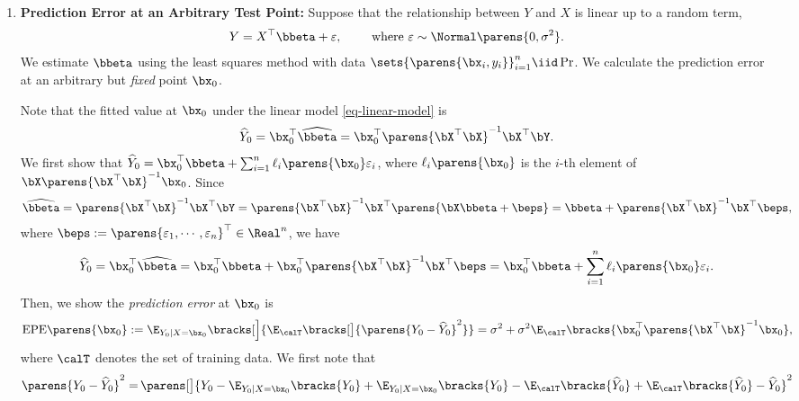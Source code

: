 \documentclass[12pt]{article}
\begin{document}
\begin{enumerate}[label=\textbf{\arabic*.}]
	\item \textbf{Prediction Error at an Arbitrary Test Point:} Suppose that the relationship between $Y$ and $X$ is linear up to a random term, 
	\begin{align}\label{eq-linear-model}
		Y = X^\top \bbeta + \varepsilon, \qquad \text{ where } \varepsilon \sim \Normal \parens{0, \sigma^2}. 
	\end{align}
	We estimate $\bbeta$ using the least squares method with data $\sets{\parens{\bx_i, y_i}}_{i=1}^n \iid \Pr$. We calculate the prediction error at an arbitrary but \emph{fixed} point $\bx_0$. 
	
	Note that the fitted value at $\bx_0$ under the linear model \eqref{eq-linear-model} is 
	\begin{align*}
		\widehat{Y}_0 = \bx_0^\top \widehat{\bbeta} = \bx_0^\top \parens{\bX^\top \bX}^{-1} \bX^\top \bY. 
	\end{align*}
	We first show that $\widehat{Y}_0 = \bx_0^\top \bbeta + \sum_{i=1}^n \ell_i \parens{\bx_0} \varepsilon_i$, where $\ell_i \parens{\bx_0}$ is the $i$-th element of $\bX \parens{\bX^\top \bX}^{-1} \bx_0$. Since 
	\begin{align*}
		\widehat{\bbeta} = \parens{\bX^\top \bX}^{-1} \bX^\top \bY = \parens{\bX^\top \bX}^{-1} \bX^\top \parens{\bX \bbeta + \beps} = \bbeta + \parens{\bX^\top \bX}^{-1} \bX^\top \beps, 
	\end{align*}
	where $\beps := \parens{\varepsilon_1, \cdots, \varepsilon_n}^\top \in \Real^n$, we have 
	\begin{align*}
		\widehat{Y}_0 = \bx_0^\top \widehat{\bbeta} = \bx_0^\top \bbeta + \bx_0^\top \parens{\bX^\top \bX}^{-1} \bX^\top \beps = \bx_0^\top \bbeta + \sum_{i=1}^n \ell_i \parens{\bx_0} \varepsilon_i. 
	\end{align*}
	Then, we show the \emph{prediction error} at $\bx_0$ is 
	\begin{align*}
		\mathrm{EPE} \parens{\bx_0} := \E_{Y_0 \mid X = \bx_0} \bracks[\Big]{\E_{\calT} \bracks[\big]{ \parens{Y_0 - \widehat{Y}_0}^2 }} = \sigma^2 + \sigma^2 \E_{\calT} \bracks{ \bx_0^\top \parens{\bX^\top \bX}^{-1} \bx_0}, 
	\end{align*}
	where $\calT$ denotes the set of training data. We first note that 
	\begin{align*}
		\parens{Y_0 - \widehat{Y}_0}^2 = & \, \parens[\big]{Y_0 - \E_{Y_0 \vert X = \bx_0} \bracks{Y_0} + \E_{Y_0 \vert X = \bx_0} \bracks{Y_0} - \E_{\calT} \bracks{\widehat{Y}_0} + \E_{\calT} \bracks{\widehat{Y}_0} - \widehat{Y}_0}^2 \\ 

\end{align*}
\end{enumerate}
\end{document}
